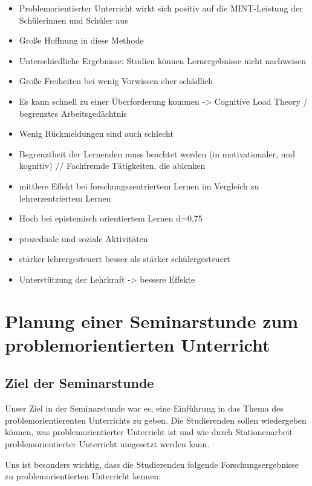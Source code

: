 \documentclass[jour,12pt,a4paper]{apa6}
\begin{document}
\begin{itemize}
  \item Problemorientierter Unterricht wirkt sich positiv auf die MINT-Leistung der Schülerinnen und Schüler aus\cite{seidel2016}
  \item Große Hoffnung in diese Methode\cite{kunter2013}
  \item Unterschiedliche Ergebnisse: Studien können Lernergebnisse nicht nachweisen\cite{kunter2013}
  \item Große Freiheiten bei wenig Vorwissen eher schädlich\cite{kunter2013}
  \item Es kann schnell zu einer Überforderung kommen\cite{kunter2013} -> Cognitive Load Theory / begrenztes Arbeitsgedächtnis
  \item Wenig Rückmeldungen sind auch schlecht\cite{kunter2013}
  \item Begrenztheit der Lernenden muss beachtet werden (in motivationaler, und kognitiv) // Fachfremde Tätigkeiten, die ablenken\cite{kunter2013}
  \item mittlere Effekt bei forschungszentriertem Lernen im Vergleich zu lehrerzentriertem Lernen
  \item Hoch bei epistemisch orientiertem Lernen d=0,75
  \item prozeduale und soziale Aktivitäten
  \item stärker lehrergesteuert besser als stärker schülergesteuert
  \item Unterstützung der Lehrkraft -> bessere Effekte
\end{itemize}

\section{Planung einer Seminarstunde zum problemorientierten Unterricht}

\subsection{Ziel der Seminarstunde}

Unser Ziel in der Seminarstunde war es, eine Einführung in das Thema des problemorientierenten Unterrichts zu geben. Die Studierenden sollen wiedergeben können, was problemorientierter Unterricht ist und wie durch Stationenarbeit problemorientierter Unterricht umgesetzt werden kann.

Uns ist besonders wichtig, dass die Studierenden folgende Forschungsergebnisse zu problemorientierten Unterricht kennen:
\end{document}
